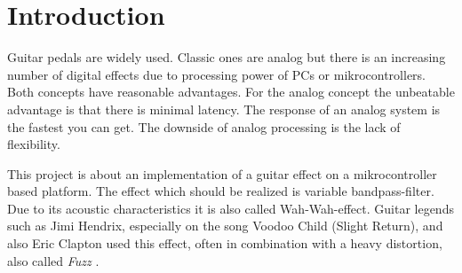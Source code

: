 \section{Introduction}

Guitar pedals are widely used. Classic ones are analog but there is an increasing number of
digital effects due to processing power of PCs or mikrocontrollers. Both concepts have
reasonable advantages. For the analog concept the unbeatable advantage is that there is
minimal latency. The response of an analog system is the fastest you can get. The downside of analog
processing is the lack of flexibility. %

This project is about an implementation of a guitar effect on a mikrocontroller based platform.
The effect which should be realized is variable bandpass-filter.
Due to its acoustic characteristics it is also called \frqq Wah-Wah\flqq-effect.
Guitar legends such as Jimi Hendrix, especially on the song Voodoo Child (Slight Return),
and also Eric Clapton used this effect, often in combination with a heavy distortion, also called \textit{Fuzz}
\cite{dailey_e_guitar} \cite{wiki_wahwah}.
